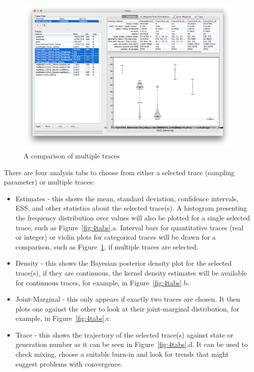 \documentclass{bioinfo}
\begin{document}
\begin{figure}[ht]
\includegraphics[width=.5\textwidth]{./figures/multitrace.png}
\caption{A comparison of multiple traces}
\label{fig:multitrace}
\end{figure}

There are four analysis tabs to choose from either a selected trace (sampling parameter) or multiple traces:

\begin{itemize}
\item Estimates - this shows the mean, standard deviation, confidence intervals, ESS, and other statistics about the selected trace(s). A histogram presenting the frequency distribution over values will also be plotted for a single selected trace, such as Figure~\ref{fig:4tabs}.a. Interval bars for quantitative traces (real or integer) or violin plots for categorical traces will be drawn for a comparison, such as Figure~\ref{fig:multitrace}, if multiple traces are selected.

\item Density - this shows the Bayesian posterior density plot for the selected trace(s), if they are continuous, the kernel density estimates will be available for continuous traces, for example, in Figure~\ref{fig:4tabs}.b.

\item Joint-Marginal - this only appears if exactly two traces are chosen. It then plots one against the other to look at their joint-marginal distribution, for example, in Figure~\ref{fig:4tabs}.c.

\item Trace - this shows the trajectory of the selected trace(s) against state or generation number as it can be seen in Figure~\ref{fig:4tabs}.d. It can be used to check mixing, choose a suitable burn-in and look for trends that might suggest problems with convergence.

\end{itemize}
\end{document}
